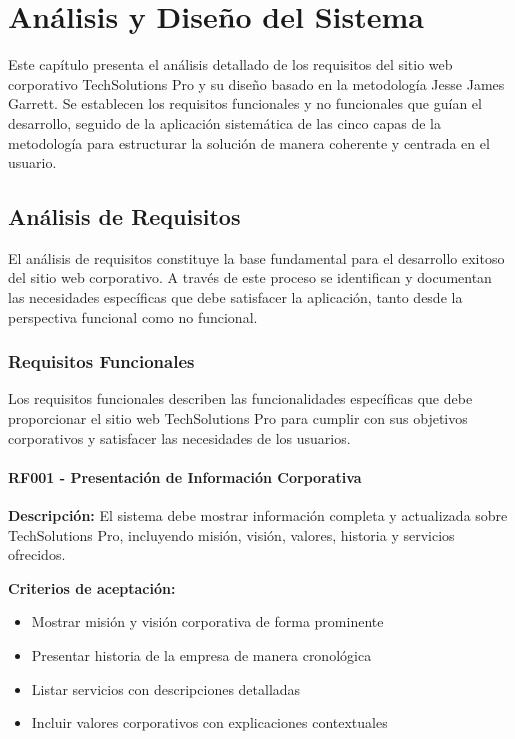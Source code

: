 \chapter{Análisis y Diseño del Sistema}
\label{cp:analisis-diseno}

Este capítulo presenta el análisis detallado de los requisitos del sitio web corporativo TechSolutions Pro y su diseño basado en la metodología Jesse James Garrett. Se establecen los requisitos funcionales y no funcionales que guían el desarrollo, seguido de la aplicación sistemática de las cinco capas de la metodología para estructurar la solución de manera coherente y centrada en el usuario.

\section{Análisis de Requisitos}

El análisis de requisitos constituye la base fundamental para el desarrollo exitoso del sitio web corporativo. A través de este proceso se identifican y documentan las necesidades específicas que debe satisfacer la aplicación, tanto desde la perspectiva funcional como no funcional.

\subsection{Requisitos Funcionales}

Los requisitos funcionales describen las funcionalidades específicas que debe proporcionar el sitio web TechSolutions Pro para cumplir con sus objetivos corporativos y satisfacer las necesidades de los usuarios.

\subsubsection{RF001 - Presentación de Información Corporativa}
\textbf{Descripción:} El sistema debe mostrar información completa y actualizada sobre TechSolutions Pro, incluyendo misión, visión, valores, historia y servicios ofrecidos.

\textbf{Criterios de aceptación:}
\begin{itemize}
    \item Mostrar misión y visión corporativa de forma prominente
    \item Presentar historia de la empresa de manera cronológica
    \item Listar servicios con descripciones detalladas
    \item Incluir valores corporativos con explicaciones contextuales
\end{itemize}

